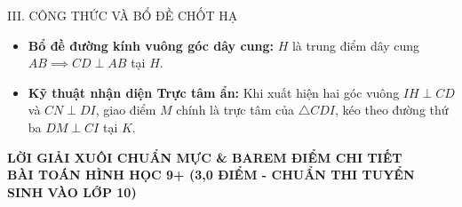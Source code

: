 \documentclass[11pt,a4paper]{article}
\begin{document}
\vspace{1mm}

\begin{formulabox}{III. CÔNG THỨC VÀ BỔ ĐỀ CHỐT HẠ}
\begin{itemize}[leftmargin=*, nosep]
    \item \textbf{Bổ đề đường kính vuông góc dây cung:} $H$ là trung điểm dây cung $AB \implies CD \perp AB$ tại $H$.
    \item \textbf{Kỹ thuật nhận diện Trực tâm ẩn:} Khi xuất hiện hai góc vuông $IH \perp CD$ và $CN \perp DI$, giao điểm $M$ chính là trực tâm của $\triangle CDI$, kéo theo đường thứ ba $DM \perp CI$ tại $K$.
\end{itemize}
\end{formulabox}

\newpage

\begin{center}
    {\Large\bfseries\color{blue!80!black} LỜI GIẢI XUÔI CHUẨN MỰC \& BAREM ĐIỂM CHI TIẾT}\\[1.5mm]
    {\large\bfseries BÀI TOÁN HÌNH HỌC 9+ (3,0 ĐIỂM - CHUẨN THI TUYỂN SINH VÀO LỚP 10)}
\end{center}

\vspace{1mm}
\end{document}
